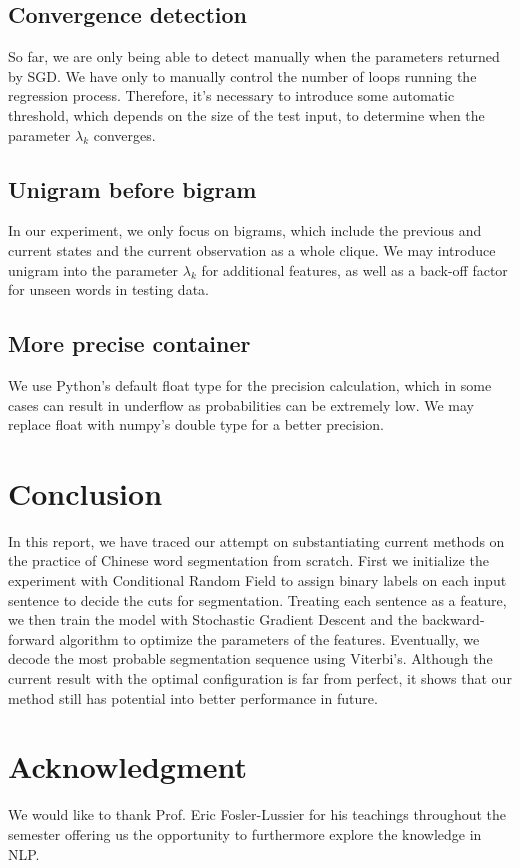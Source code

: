 \documentclass[UTF8,11pt]{article}
\begin{document}
\subsection{Convergence detection}
\noindent So far, we are only being able to detect manually when the parameters returned by SGD. We have only to manually control the number of loops running the regression process. Therefore, it's necessary to introduce some automatic threshold, which depends on the size of the test input, to determine when the parameter $\lambda_k$ converges.

\subsection{Unigram before bigram}
\noindent In our experiment, we only focus on bigrams, which include the previous and current states and the current observation as a whole clique. We may introduce unigram into the parameter $\lambda_k$ for additional features, as well as a back-off factor for unseen words in testing data.

\subsection{More precise container}
\noindent We use Python's default float type for the precision calculation, which in some cases can result in underflow as probabilities can be extremely low. We may replace float with numpy's double type for a better precision.

\section{Conclusion}
\noindent In this report, we have traced our attempt on substantiating current methods on the practice of Chinese word segmentation from scratch. First we initialize the experiment with Conditional Random Field to assign binary labels on each input sentence to decide the cuts for segmentation. Treating each sentence as a feature, we then train the model with Stochastic Gradient Descent and the backward-forward algorithm to optimize the parameters of the features. Eventually, we decode the most probable segmentation sequence using Viterbi's. Although the current result with the optimal configuration is far from perfect, it shows that our method still has potential into better performance in future.

\section{Acknowledgment}
\noindent We would like to thank Prof. Eric Fosler-Lussier for his teachings throughout the semester offering us the opportunity to furthermore explore the knowledge in NLP.
\end{document}
